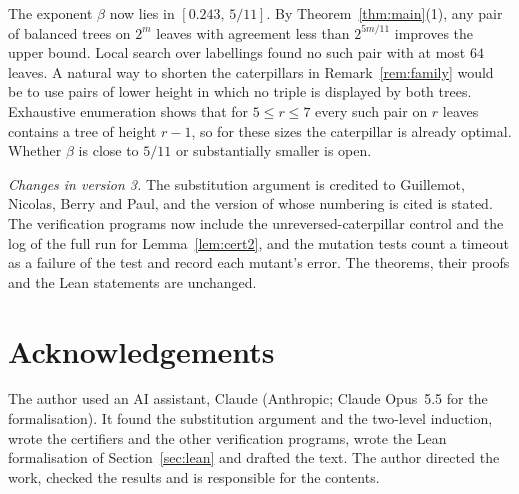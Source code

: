 \documentclass[11pt]{amsart}
\theoremstyle{definition}
\begin{document}
The exponent $\beta$ now lies in $[0.243,\,5/11]$. By Theorem~\ref{thm:main}(1), any pair of
balanced trees on $2^m$ leaves with agreement less than $2^{5m/11}$ improves the upper bound.
Local search over labellings found no such pair with at most $64$ leaves.
A natural way to shorten the caterpillars in Remark~\ref{rem:family} would be to use pairs of
lower height in which no triple is displayed by both trees. Exhaustive enumeration shows that
for $5\le r\le 7$ every such pair on $r$ leaves contains a tree of height $r-1$, so for these
sizes the caterpillar is already optimal. Whether $\beta$ is close to $5/11$ or substantially smaller is open.

\emph{Changes in version 3.} The substitution argument is credited to Guillemot, Nicolas, Berry
and Paul, and the version of \cite{BLOSSW} whose numbering is cited is stated. The verification
programs now include the unreversed-caterpillar control and the log of the full run for
Lemma~\ref{lem:cert2}, and the mutation tests count a timeout as a failure of the test and record each mutant's error. The theorems,
their proofs and the Lean statements are unchanged.

\section*{Acknowledgements}
The author used an AI assistant, Claude (Anthropic; Claude Opus~5.5 for the formalisation). It
found the substitution argument and the two-level induction, wrote the certifiers and the other
verification programs, wrote the Lean formalisation of Section~\ref{sec:lean} and drafted the text. The
author directed the work, checked the results and is responsible for the contents.
\end{document}
